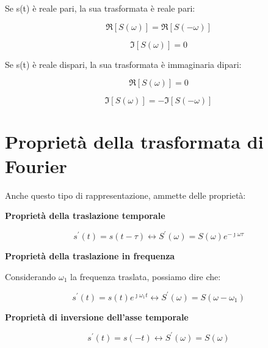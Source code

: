 Se s(t) è reale pari, la sua trasformata è reale pari:

{
    \Large 
    \begin{equation}
        \Re[S(\omega)] = \Re[S(-\omega)]
    \end{equation}
}

{
    \Large 
    \begin{equation}
        \Im[S(\omega)] = 0
    \end{equation}
}

Se s(t) è reale dispari, la sua trasformata è immaginaria dipari:

{
    \Large 
    \begin{equation}
        \Re[S(\omega)] = 0
    \end{equation}
}

{
    \Large 
    \begin{equation}
        \Im[S(\omega)] = -\Im[S(-\omega)] 
    \end{equation}
}


\newpage 

\section{Proprietà della trasformata di Fourier} 

Anche questo tipo di rappresentazione, ammette delle proprietà: \newline 

\textbf{Proprietà della traslazione temporale} 

{
    \Large
    \begin{equation}
        s^{'} (t) = s(t - \tau) 
        \leftrightarrow 
        S^{'} (\omega) = S(\omega) e^{-\jmath \omega \tau}
    \end{equation}
}

\textbf{Proprietà della traslazione in frequenza}

Considerando $\omega_1$ la frequenza traslata, possiamo dire che: 

{
    \Large 
    \begin{equation}
        s^{'} (t) = s(t) e^{\jmath \omega_1 t} 
        \leftrightarrow 
        S^{'} (\omega) = S(\omega -\omega_1)
    \end{equation}
}


\textbf{Proprietà di inversione dell'asse temporale}

{
    \Large 
    \begin{equation}
        s^{'} (t) = s (-t)
        \leftrightarrow 
        S^{'} (\omega) = S(\omega)
    \end{equation}
}

